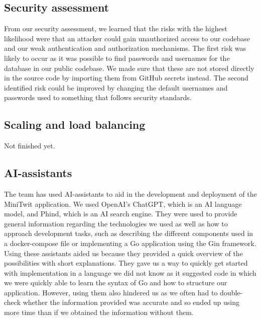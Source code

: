 \subsection{Security assessment}
From our security assessment, we learned that the risks with the highest likelihood were that an attacker could gain unauthorized access to our codebase
and our weak authentication and authorization mechanisms. The first risk was likely to occur as it was possible to find passwords and usernames for the database 
in our public codebase. We made sure that these are not stored directly in the source code by importing them from GitHub secrets instead. The second identified 
risk could be improved by changing the default usernames and passwords used to something that follows security standards.  

\subsection{Scaling and load balancing}
Not finished yet.

\subsection{AI-assistants}
The team has used AI-assistants to aid in the development and deployment of the MiniTwit application. We used OpenAI's ChatGPT, which is an AI language model, 
and Phind, which is an AI search engine. They were used to provide general information regarding the technologies we used as well as how to approach development tasks,
such as describing the different components used in a docker-compose file or implementing a Go application using the Gin framework. \\
  
Using these assistants aided us because they provided a quick overview of the possibilities with short explanations. They gave us a way to quickly get started with
implementation in a language we did not know as it suggested code in which we were quickly able to learn the syntax of Go and how to structure our application. However, 
using them also hindered us as we often had to double-check whether the information provided was accurate and so ended up using more time than if we obtained the information 
without them. 